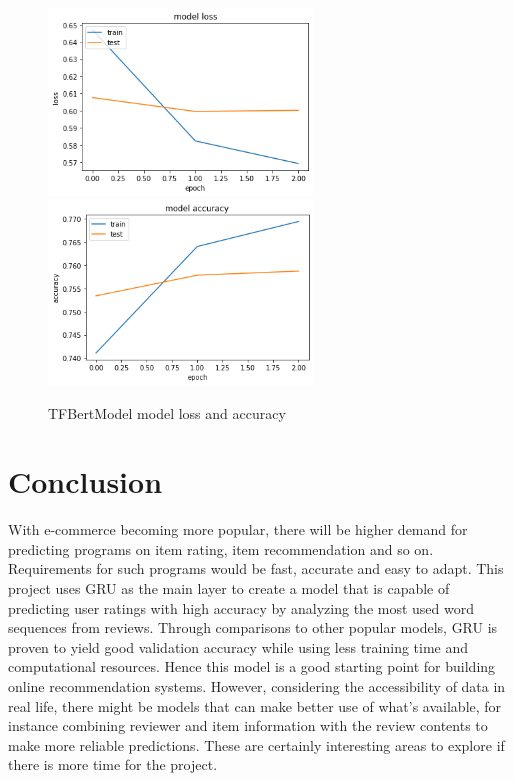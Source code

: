 \documentclass[12pt]{article}
\begin{document}
\begin{figure}[h!]
    \centering
    \includegraphics[width=70mm,scale=0.5]{trans_loss.png}
    \includegraphics[width=70mm,scale=0.5]{trans_acc.png}
    \caption{TFBertModel model loss and accuracy}
    \label{fig:tr}
    \vspace{-0.5cm}
\end{figure}
\section{Conclusion}
\vspace{-0.3cm}
With e-commerce becoming more popular, there will be higher demand for predicting programs on item rating, item recommendation and so on. Requirements for such programs would be fast, accurate and easy to adapt. This project uses GRU as the main layer to create a model that is capable of predicting user ratings with high accuracy by analyzing the most used word sequences from reviews. Through comparisons to other popular models, GRU is proven to yield good validation accuracy while using less training time and computational resources. Hence this model is a good starting point for building online recommendation systems. However, considering the accessibility of data in real life, there might be models that can make better use of what’s available, for instance combining reviewer and item information with the review contents to make more reliable predictions. These are certainly interesting areas to explore if there is more time for the project.
\end{document}
